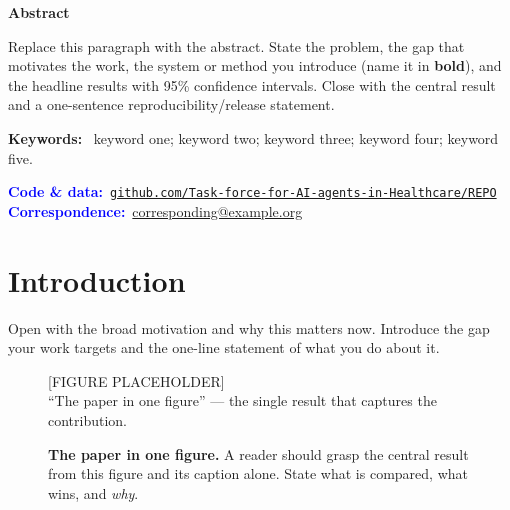 \documentclass[11pt]{article}
\let\oldincludegraphics\includegraphics
\renewcommand{\includegraphics}[2][]{%
  \setlength{\fboxsep}{0pt}\setlength{\fboxrule}{0.5pt}%
  \fbox{\oldincludegraphics[#1]{#2}}}
\newcommand{\todofig}[2]{%
  \begin{tcolorbox}[colback=black!4, colframe=black!35, arc=3pt, boxrule=0.5pt,
    halign=center, valign=center, height=#1, width=\linewidth]
    {\ttfamily\small [FIGURE PLACEHOLDER]\\[4pt] #2}
  \end{tcolorbox}}
\begin{document}
\vspace{0.5em}
\begin{tcolorbox}[breakable, enhanced jigsaw, colback=black!4, colframe=black!4,
  arc=5pt, boxrule=0pt, left=16pt, right=16pt, top=10pt, bottom=10pt]
\setlength{\parskip}{0pt}
{\centering\large\bfseries Abstract\par}
\smallskip
\fontsize{9.5}{11.3}\selectfont
Replace this paragraph with the abstract. State the problem, the gap that motivates
the work, the system or method you introduce (name it in \textbf{bold}), and the
headline results with 95\% confidence intervals. Close with the central result and a
one-sentence reproducibility/release statement.

\medskip
\noindent\textbf{Keywords:}~%
keyword one; keyword two; keyword three; keyword four; keyword five.

\medskip
\noindent\textcolor{blue}{\textbf{Code \& data:}}~\href{https://github.com/Task-force-for-AI-agents-in-Healthcare/REPO}{\texttt{github.com/Task-force-for-AI-agents-in-Healthcare/REPO}}\\
\noindent\textcolor{blue}{\textbf{Correspondence:}}~\href{mailto:corresponding@example.org}{corresponding@example.org}
\end{tcolorbox}

\vspace{2pt}
\vspace{0.3em}

\section{Introduction}
Open with the broad motivation and why this matters now. Introduce the gap your
work targets and the one-line statement of what you do about it.

\begin{figure}[htb]
\centering
\todofig{5cm}{``The paper in one figure'' — the single result that captures the contribution.}
\caption{\textbf{The paper in one figure.} A reader should grasp the central result
from this figure and its caption alone. State what is compared, what wins, and
\emph{why}.}
\label{fig:hero}
\end{figure}
\end{document}
